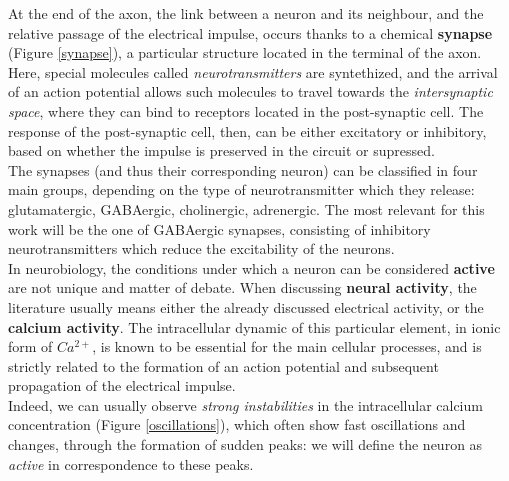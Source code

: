 \documentclass[12pt, a4paper]{report}
\begin{document}
At the end of the axon, the link between a neuron and its neighbour, and the relative passage of the electrical impulse, occurs thanks to a chemical \textbf{synapse} (Figure \ref{synapse}), a particular structure located in the terminal of the axon. Here, special molecules called \textit{neurotransmitters} are syntethized, and the arrival of an action potential allows such molecules to travel towards the \textit{intersynaptic space}, where they can bind to receptors located in the post-synaptic cell. The response of the post-synaptic cell, then, can be either excitatory or inhibitory, based on whether the impulse is preserved in the circuit or supressed.\\
The synapses (and thus their corresponding neuron) can be classified in four main groups, depending on the type of neurotransmitter which they release:  glutamatergic, GABAergic, cholinergic,  adrenergic. The most relevant for this work will be the one of GABAergic synapses, consisting of inhibitory neurotransmitters which reduce the excitability of the neurons.\\

In neurobiology, the conditions under which a neuron can be considered \textbf{active} are not unique and matter of debate. When discussing \textbf{neural activity}, the literature usually means either the already discussed electrical activity, or the \textbf{calcium activity}. The intracellular dynamic of this particular element, in ionic form of $Ca^{2+}$, is known to be essential for the main cellular processes, and is strictly related to the formation of an action potential and subsequent propagation of the electrical impulse.\\
 Indeed, we can usually observe  \textit{strong instabilities} in the intracellular calcium concentration (Figure \ref{oscillations}), which often show fast oscillations and changes, through the formation of sudden peaks: we will define the neuron as \textit{active} in correspondence to these peaks.
 
\end{document}
